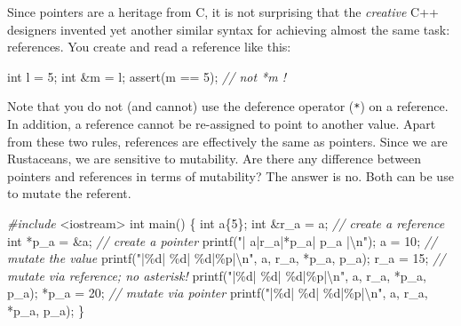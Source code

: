 \documentclass[
]{book}
\newenvironment{Shaded}{\begin{snugshade}}{\end{snugshade}}
\newcommand{\CommentTok}[1]{\textcolor[rgb]{0.56,0.35,0.01}{\textit{#1}}}
\newcommand{\DataTypeTok}[1]{\textcolor[rgb]{0.13,0.29,0.53}{#1}}
\newcommand{\DecValTok}[1]{\textcolor[rgb]{0.00,0.00,0.81}{#1}}
\newcommand{\ImportTok}[1]{#1}
\newcommand{\NormalTok}[1]{#1}
\newcommand{\OtherTok}[1]{\textcolor[rgb]{0.56,0.35,0.01}{#1}}
\newcommand{\PreprocessorTok}[1]{\textcolor[rgb]{0.56,0.35,0.01}{\textit{#1}}}
\newcommand{\SpecialCharTok}[1]{\textcolor[rgb]{0.00,0.00,0.00}{#1}}
\newcommand{\StringTok}[1]{\textcolor[rgb]{0.31,0.60,0.02}{#1}}
\begin{document}
Since pointers are a heritage from C, it is not surprising that the \emph{creative} C++ designers invented yet another similar syntax for achieving almost the same task: references. You create and read a reference like this:

\begin{Shaded}
\begin{Highlighting}[]
\DataTypeTok{int}\NormalTok{ l = }\DecValTok{5}\NormalTok{;}
\DataTypeTok{int}\NormalTok{ \&m = l;}
\OtherTok{assert}\NormalTok{(m == }\DecValTok{5}\NormalTok{); }\CommentTok{// not \textasciigrave{}*m\textasciigrave{} !}
\end{Highlighting}
\end{Shaded}

Note that you do not (and cannot) use the deference operator (\texttt{*}) on a reference. In addition, a reference cannot be re-assigned to point to another value. Apart from these two rules, references are effectively the same as pointers.
Since we are Rustaceans, we are sensitive to mutability. Are there any difference between pointers and references in terms of mutability? The answer is no. Both can be use to mutate the referent.

\begin{Shaded}
\begin{Highlighting}[]
\PreprocessorTok{\#include }\ImportTok{\textless{}iostream\textgreater{}}
\DataTypeTok{int}\NormalTok{ main()}
\NormalTok{\{}
    \DataTypeTok{int}\NormalTok{ a\{}\DecValTok{5}\NormalTok{\};}
    \DataTypeTok{int}\NormalTok{ \&r\_a = a;  }\CommentTok{// create a reference}
    \DataTypeTok{int}\NormalTok{ *p\_a = \&a; }\CommentTok{// create a pointer}
\NormalTok{    printf(}\StringTok{"| a|r\_a|*p\_a|     p\_a      |}\SpecialCharTok{\textbackslash{}n}\StringTok{"}\NormalTok{);}
\NormalTok{    a = }\DecValTok{10}\NormalTok{; }\CommentTok{// mutate the value}
\NormalTok{    printf(}\StringTok{"|}\SpecialCharTok{\%d}\StringTok{| }\SpecialCharTok{\%d}\StringTok{|  }\SpecialCharTok{\%d}\StringTok{|}\SpecialCharTok{\%p}\StringTok{|}\SpecialCharTok{\textbackslash{}n}\StringTok{"}\NormalTok{, a, r\_a, *p\_a, p\_a);}
\NormalTok{    r\_a = }\DecValTok{15}\NormalTok{; }\CommentTok{// mutate via reference; no asterisk!}
\NormalTok{    printf(}\StringTok{"|}\SpecialCharTok{\%d}\StringTok{| }\SpecialCharTok{\%d}\StringTok{|  }\SpecialCharTok{\%d}\StringTok{|}\SpecialCharTok{\%p}\StringTok{|}\SpecialCharTok{\textbackslash{}n}\StringTok{"}\NormalTok{, a, r\_a, *p\_a, p\_a);}
\NormalTok{    *p\_a = }\DecValTok{20}\NormalTok{; }\CommentTok{// mutate via pointer}
\NormalTok{    printf(}\StringTok{"|}\SpecialCharTok{\%d}\StringTok{| }\SpecialCharTok{\%d}\StringTok{|  }\SpecialCharTok{\%d}\StringTok{|}\SpecialCharTok{\%p}\StringTok{|}\SpecialCharTok{\textbackslash{}n}\StringTok{"}\NormalTok{, a, r\_a, *p\_a, p\_a);}
\NormalTok{\}}
\end{Highlighting}
\end{Shaded}
\end{document}
